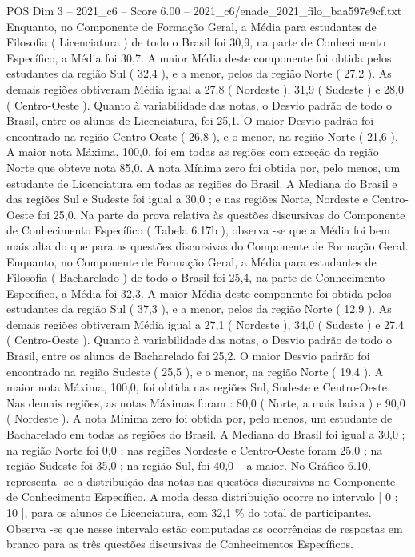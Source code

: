 \begin{textsample}{POS Dim 3 – 2021\_c6 – Score 6.00 – 2021\_c6/enade\_2021\_filo\_baa597e9cf.txt}
Enquanto, no Componente de Formação Geral, a Média para estudantes de Filosofia ( Licenciatura ) de todo o Brasil foi 30,9, na parte de Conhecimento Específico, a Média foi 30,7.
A maior Média deste componente foi obtida pelos estudantes da região Sul ( 32,4 ), e a menor, pelos da região Norte ( 27,2 ).
As demais regiões obtiveram Média igual a 27,8 ( Nordeste ), 31,9 ( Sudeste ) e 28,0 ( Centro-Oeste ).
Quanto à variabilidade das notas, o Desvio padrão de todo o Brasil, entre os alunos de Licenciatura, foi 25,1.
O maior Desvio padrão foi encontrado na região Centro-Oeste ( 26,8 ), e o menor, na região Norte ( 21,6 ).
A maior nota Máxima, 100,0, foi em todas as regiões com exceção da região Norte que obteve nota 85,0.
A nota Mínima zero foi obtida por, pelo menos, um estudante de Licenciatura em todas as regiões do Brasil.
A Mediana do Brasil e das regiões Sul e Sudeste foi igual a 30,0 ; e nas regiões Norte, Nordeste e Centro-Oeste foi 25,0.
Na parte da prova relativa às questões discursivas do Componente de Conhecimento Específico ( Tabela 6.17b ), observa -se que a Média foi bem mais alta do que para as questões discursivas do Componente de Formação Geral.
Enquanto, no Componente de Formação Geral, a Média para estudantes de Filosofia ( Bacharelado ) de todo o Brasil foi 25,4, na parte de Conhecimento Específico, a Média foi 32,3.
A maior Média deste componente foi obtida pelos estudantes da região Sul ( 37,3 ), e a menor, pelos da região Norte ( 12,9 ).
As demais regiões obtiveram Média igual a 27,1 ( Nordeste ), 34,0 ( Sudeste ) e 27,4 ( Centro-Oeste ).
Quanto à variabilidade das notas, o Desvio padrão de todo o Brasil, entre os alunos de Bacharelado foi 25,2.
O maior Desvio padrão foi encontrado na região Sudeste ( 25,5 ), e o menor, na região Norte ( 19,4 ).
A maior nota Máxima, 100,0, foi obtida nas regiões Sul, Sudeste e Centro-Oeste.
Nas demais regiões, as notas Máximas foram : 80,0 ( Norte, a mais baixa ) e 90,0 ( Nordeste ).
A nota Mínima zero foi obtida por, pelo menos, um estudante de Bacharelado em todas as regiões do Brasil.
A Mediana do Brasil foi igual a 30,0 ; na região Norte foi 0,0 ; nas regiões Nordeste e Centro-Oeste foram 25,0 ; na região Sudeste foi 35,0 ; na região Sul, foi 40,0 – a maior.
No Gráfico 6.10, representa -se a distribuição das notas nas questões discursivas no Componente de Conhecimento Específico.
A moda dessa distribuição ocorre no intervalo [ 0 ; 10 ], para os alunos de Licenciatura, com 32,1 \% do total de participantes.
Observa -se que nesse intervalo estão computadas as ocorrências de respostas em branco para as três questões discursivas de Conhecimentos Específicos.

\end{textsample}
